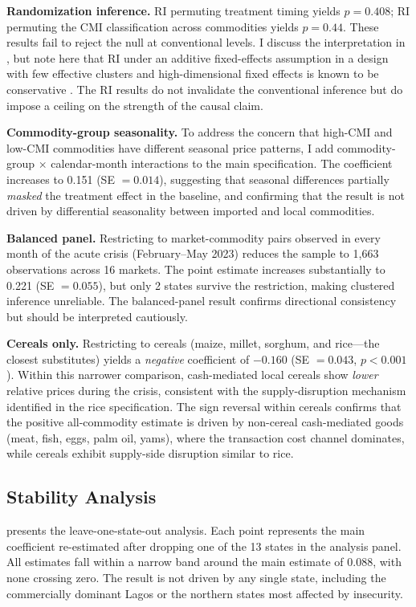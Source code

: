 \documentclass[12pt]{article}
\begin{document}
\textbf{Randomization inference.} RI permuting treatment timing yields $p = 0.408$; RI permuting the CMI classification across commodities yields $p = 0.44$. These results fail to reject the null at conventional levels. I discuss the interpretation in , but note here that RI under an additive fixed-effects assumption in a design with few effective clusters and high-dimensional fixed effects is known to be conservative \citep{young2019channeling, mackinnon2023cluster}. The RI results do not invalidate the conventional inference but do impose a ceiling on the strength of the causal claim.

\textbf{Commodity-group seasonality.} To address the concern that high-CMI and low-CMI commodities have different seasonal price patterns, I add commodity-group $\times$ calendar-month interactions to the main specification. The coefficient increases to 0.151 (SE $= 0.014$), suggesting that seasonal differences partially \emph{masked} the treatment effect in the baseline, and confirming that the result is not driven by differential seasonality between imported and local commodities.

\textbf{Balanced panel.} Restricting to market-commodity pairs observed in every month of the acute crisis (February--May 2023) reduces the sample to 1,663 observations across 16 markets. The point estimate increases substantially to 0.221 (SE $= 0.055$), but only 2 states survive the restriction, making clustered inference unreliable. The balanced-panel result confirms directional consistency but should be interpreted cautiously.

\textbf{Cereals only.} Restricting to cereals (maize, millet, sorghum, and rice---the closest substitutes) yields a \emph{negative} coefficient of $-0.160$ (SE $= 0.043$, $p < 0.001$). Within this narrower comparison, cash-mediated local cereals show \emph{lower} relative prices during the crisis, consistent with the supply-disruption mechanism identified in the rice specification. The sign reversal within cereals confirms that the positive all-commodity estimate is driven by non-cereal cash-mediated goods (meat, fish, eggs, palm oil, yams), where the transaction cost channel dominates, while cereals exhibit supply-side disruption similar to rice.

\subsection{Stability Analysis}

 presents the leave-one-state-out analysis. Each point represents the main coefficient re-estimated after dropping one of the 13 states in the analysis panel. All estimates fall within a narrow band around the main estimate of 0.088, with none crossing zero. The result is not driven by any single state, including the commercially dominant Lagos or the northern states most affected by insecurity.
\end{document}
